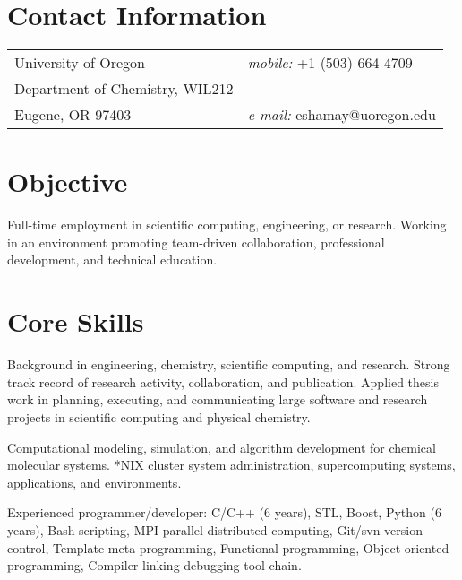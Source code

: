 \documentclass[margin,line]{res}
\begin{document}

\begin{resume}
\section{\sc Contact Information}
\vspace{.05in}
\begin{tabular}{@{}p{3.5in}p{3.5in}}
University of Oregon             		& {\it mobile:}  +1 (503) 664-4709\\
Department of Chemistry, WIL212         & \\
Eugene, OR 97403                    	& {\it e-mail:}  eshamay@uoregon.edu
\end{tabular}


\section{\sc Objective}
Full-time employment in scientific computing, engineering, or research. Working in an environment promoting team-driven collaboration, professional development, and technical education.


\section{\sc Core Skills} 
Background in engineering, chemistry, scientific computing, and research. Strong track record of research activity, collaboration, and publication. Applied thesis work in planning, executing, and communicating large software and research projects in scientific computing and physical chemistry.

\vspace*{-.1in}
Computational modeling, simulation, and algorithm development for chemical molecular systems. *NIX cluster system administration, supercomputing systems, applications, and environments.

\vspace*{-.1in}
Experienced programmer/developer: C/C++ (6 years), STL, Boost, Python (6 years), Bash scripting, MPI parallel distributed computing, Git/svn version control, Template meta-programming, Functional programming, Object-oriented programming, Compiler-linking-debugging tool-chain.



\end{resume}
\end{document}

